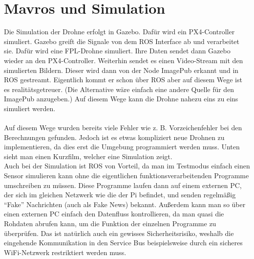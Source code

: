 \section{Mavros und Simulation}
Die Simulation der Drohne erfolgt in Gazebo. Dafür wird ein PX4-Controller simuliert. Gazebo greift die Signale von dem ROS Interface ab und verarbeitet sie. Dafür wird eine FPL-Drohne simuliert. Ihre Daten sendet dann Gazebo wieder an den PX4-Controller. Weiterhin sendet es einen Video-Stream mit den simulierten Bildern. Dieser wird dann von der Node ImagePub erkannt und in ROS gestreamt. Eigentlich kommt er schon über ROS aber auf diesem Wege ist es realitätsgetreuer. (Die Alternative wäre einfach eine andere Quelle für den ImagePub anzugeben.) Auf diesem Wege kann die Drohne nahezu eins zu eins simuliert werden. \\
\\
Auf diesem Wege wurden bereits viele Fehler wie z. B. Vorzeichenfehler bei den Berechnungen gefunden. Jedoch ist es etwas kompliziert neue Drohnen zu implementieren, da dies erst die Umgebung programmiert werden muss. Unten sieht man einen Kurzfilm, welcher eine Simulation zeigt.
\\
Auch bei der Simulation ist ROS von Vorteil, da man im Testmodus einfach einen Sensor simulieren kann ohne die eigentlichen funktionsverarbeitenden Programme umschreiben zu müssen. Diese Programme laufen dann auf einem externen PC, der sich im gleichen Netzwerk wie die der Pi befindet, und senden regelmäßig ``Fake'' Nachrichten (auch als Fake News) bekannt.
Außerdem kann man so \"uber einen externen PC einfach den Datenfluss kontrollieren, da man quasi die Rohdaten abrufen kann, um die Funktion der einzelnen Programme zu überprüfen. Das ist natürlich auch ein gewisses Sicherheitsrisiko, weshalb die eingehende Kommunikation in den Service Bus beispielsweise durch ein sicheres WiFi-Netzwerk restriktiert werden muss. 
